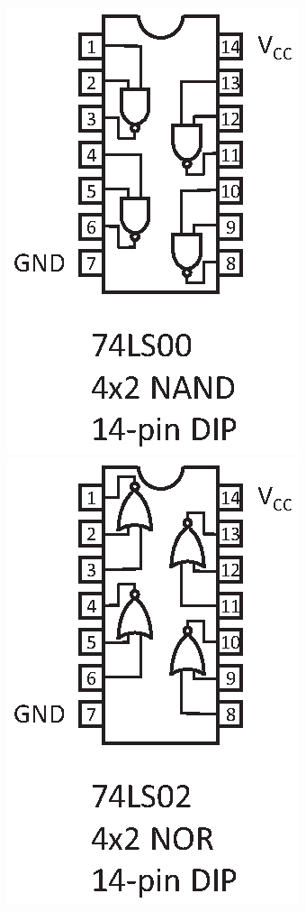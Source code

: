 \hspace{0.25in}
\includegraphics[scale=0.8]{appendices/pinouts/74LS00_pinout.eps}
\includegraphics[scale=0.8]{appendices/pinouts/74LS02_pinout.eps}
